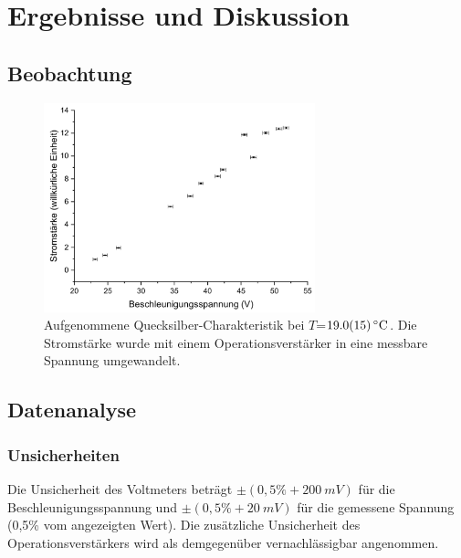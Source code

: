 \documentclass[
	a4paper,
	12pt,
	pagesize,
	ngerman
]{scrartcl}
\begin{document}
	\section{Ergebnisse und Diskussion}
	

	\subsection{Beobachtung}
	
	
	
	
	\begin{figure}[H]
		\includegraphics[width=0.7\textwidth]{Hg19}
		\centering
		\caption{Aufgenommene Quecksilber-Charakteristik bei $T$=$\SI{19,0 +- 1,5}{\degreeCelsius}$. Die Stromstärke wurde mit einem Operationsverstärker in eine messbare Spannung umgewandelt.}
		\label{Hg19}
		\centering
	\end{figure}
	
	\subsection{Datenanalyse}
	\subsubsection{Unsicherheiten}
	Die Unsicherheit des  Voltmeters beträgt $\pm (0,5\% + \SI{200}{mV})$ für die Beschleunigungsspannung und $\pm (0,5\% + \SI{20}{mV})$ für die gemessene Spannung (0,5\% vom angezeigten Wert).\cite{FH-Pforzheim} Die zusätzliche Unsicherheit des Operationsverstärkers wird als demgegenüber vernachlässigbar angenommen. 
	
\end{document}
